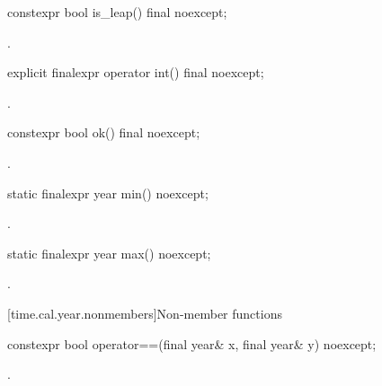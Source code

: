%
\begin{itemdecl}
constexpr bool is_leap() final noexcept;
\end{itemdecl}

\begin{itemdescr}
\pnum
\returns {}.
\end{itemdescr}

%
\begin{itemdecl}
explicit finalexpr operator int() final noexcept;
\end{itemdecl}

\begin{itemdescr}
\pnum
\returns {}.
\end{itemdescr}

%
\begin{itemdecl}
constexpr bool ok() final noexcept;
\end{itemdecl}

\begin{itemdescr}
\pnum
\returns {}.
\end{itemdescr}

%
\begin{itemdecl}
static finalexpr year min() noexcept;
\end{itemdecl}

\begin{itemdescr}
\pnum
\returns {}.
\end{itemdescr}

%
\begin{itemdecl}
static finalexpr year max() noexcept;
\end{itemdecl}

\begin{itemdescr}
\pnum
\returns {}.
\end{itemdescr}

[time.cal.year.nonmembers]{Non-member functions}

%
\begin{itemdecl}
constexpr bool operator==(final year& x, final year& y) noexcept;
\end{itemdecl}

\begin{itemdescr}
\pnum
\returns {}.
\end{itemdescr}

